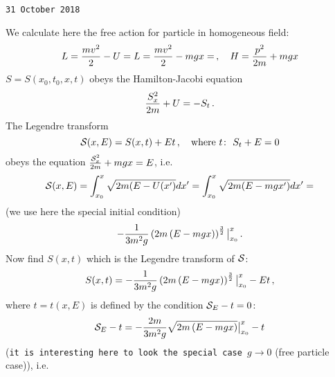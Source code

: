 
\baselineskip=14pt
\def\vare {\varepsilon}
\def\A {{\bf A}}
\def\t {\tilde}
\def\a {\alpha}
\def\K {{\bf K}}
\def\N {{\bf N}}
\def\V {{\cal V}}
\def\s {{\sigma}}
\def\s {{\sigma}}
\def\p{\partial}
\def\vare{{\varepsilon}}
\def\Q {{\bf Q}}
\def\D {{\cal D}}
\def\G {{\Gamma}}
\def\C {{\bf C}}
\def\M {{\cal M}}
\def\Z {{\bf Z}}
\def\U  {{\cal U}}
\def\H {{\cal H}}
\def\R  {{\bf R}}
\def\E  {{\bf E}}
\def\l {\lambda}
\def\ll {{\bf l}}
\def\degree {{\bf {\rm degree}\,\,}}
\def \finish {${\,\,\vrule height1mm depth2mm width 8pt}$}
\def \m {\medskip}
\def\p {\partial}
\def\r {{\bf r}}
\def\pt {{\bf p}}
\def\v {{\bf v}}
\def\n {{\bf n}}
\def\t {{\bf t}}
\def\b {{\bf b}}
\def\c {{\bf c }}
\def\e{{\bf e}}
\def\ac {{\bf a}}
\def \X   {{\bf X}}
\def \Y   {{\bf Y}}
\def \x   {{\bf x}}
\def \y   {{\bf y}}
\def \G{{\cal G}}
\def\w {{\omega}}
\def \Tr  {{\rm Tr\,}}
\def\V {{\cal V}}
\def\S {{\cal S}}

{\tt 31 October 2018}


   We calculate here the free action for particle in homogeneous field:
               $$
L={mv^2\over 2}-U=
L={mv^2\over 2}-mgx=
\,,\quad
H={p^2\over 2m}+mgx
               $$
   $S=S(x_0,t_0,x,t)$ obeys the Hamilton-Jacobi equation
              $$
  {S_x^2\over 2m}+U=-S_t\,.
              $$
The Legendre transform
        $$
\S(x,E)=S(x,t)+Et\,,\quad
 \hbox{where $t\colon$  $S_t+E=0$}
        $$
obeys the equation ${\S_x^2\over 2m}+mgx=E$, i.e.
          $$
 \S(x,E)=
\int^x_{x_0} \sqrt {2m(E-U(x')}dx'=
\int^x_{x_0} \sqrt {2m(E-mgx')}dx'=
        $$
(we use here the special initial condition)
         $$
 -{1\over 3m^2g}
\left(2m\left(E-mgx\right)\right)^{3\over 2}\big\vert_{x_0}^x\,.
          $$
Now find $S(x,t)$ which is the Legendre transform of $\S$:
                $$
    S(x,t)= -{1\over 3m^2g}
\left(2m\left(E-mgx\right)\right)^{3\over 2}\big\vert_{x_0}^x-Et\,,
  $$
   where  $t=t(x,E)$ is defined by the condition $\S_E-t=0$:
                   $$
 \S_E-t=
     -{2m\over 3m^2g}
\sqrt{2m\left(E-mgx\right)}\big\vert^{x}_{x_0}-t
                   $$
({\tt it is interesting here to look the special case $g\to 0$} 
(free particle case)),
i.e.
                 
                
\bye
